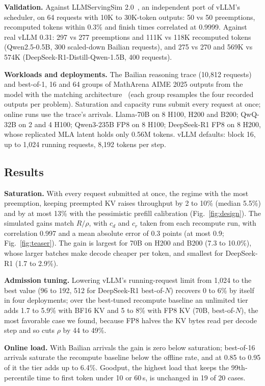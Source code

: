 \documentclass[journal]{IEEEtran}
\begin{document}
\textbf{Validation.} Against LLMServingSim 2.0~\cite{llmservingsim2}, an independent port of vLLM's
scheduler, on 64 requests with 10K to 30K-token outputs: 50 vs 50 preemptions, recomputed tokens
within 0.3\% and finish times correlated at 0.9999. Against real vLLM 0.31:
297 vs 277 preemptions and 111K vs 118K recomputed tokens (Qwen2.5-0.5B, 300 scaled-down Bailian
requests), and 275 vs 270 and 569K vs 574K (DeepSeek-R1-Distill-Qwen-1.5B, 400 requests).

\textbf{Workloads and deployments.} The Bailian reasoning trace (10,812 requests) and best-of-1, 16
and 64 groups of MathArena AIME 2025 outputs from the model with the matching
architecture~\cite{matharena} (each group resamples the four recorded outputs per problem).
Saturation and capacity runs submit every request at once; online runs use the trace's arrivals.
Llama-70B on 8 H100, H200 and B200; QwQ-32B on 2 and 4 H100; Qwen3-235B FP8 on 8 H100; DeepSeek-R1
FP8 on 8 H200, whose replicated MLA latent holds only 0.56M tokens. vLLM defaults: block 16, up to
1,024 running requests, 8,192 tokens per step.

\subsection{Results}

\textbf{Saturation.} With every request submitted at once, the regime with the most preemption,
keeping preempted KV raises throughput by 2 to 10\% (median 5.5\%) and by at most 13\% with the
pessimistic prefill calibration (Fig.~\ref{fig:design}). The simulated gains match $R/\rho$, with
$c_d$ and $c_r$ taken from each recompute run, with correlation 0.997 and a mean absolute error of
0.3 points (at most 0.9; Fig.~\ref{fig:teaser}). The gain is largest for 70B on H200 and B200 (7.3 to 10.0\%), whose
larger batches make decode cheaper per token, and smallest for DeepSeek-R1 (1.7 to 2.9\%).

\textbf{Admission tuning.} Lowering vLLM's running-request limit from 1,024 to the best value (96 to
192, 512 for DeepSeek-R1 best-of-$N$) recovers 0 to 6\% by itself in four deployments; over the best-tuned
recompute baseline an unlimited tier adds 1.7 to 5.9\% with BF16 KV and 5 to 8\% with FP8 KV (70B,
best-of-$N$), the most favorable case we found, because FP8 halves the KV bytes read per decode step
and so cuts $\rho$ by 44 to 49\%.

\textbf{Online load.} With Bailian arrivals the gain is zero below saturation; best-of-16 arrivals
saturate the recompute baseline below the offline rate, and at 0.85 to 0.95 of it the tier adds up
to 6.4\%. Goodput, the highest load that keeps the 99th-percentile time to first token under 10 or
60\,s, is unchanged in 19 of 20 cases.
\end{document}
